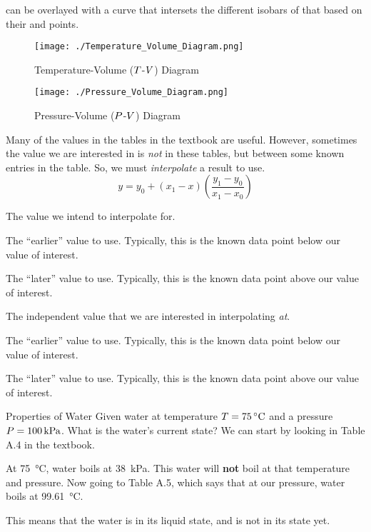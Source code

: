  can be overlayed with a curve that intersets the different isobars of that  based on their  and  points.

\begin{figure}[h!tbp]
  \centering
  \texttt{[image: ./Temperature\_Volume\_Diagram.png]}
  \caption{Temperature-Volume ($T$-$V$) Diagram}
  \label{fig:Temperature_Pressure_Diagram}
\end{figure}

\begin{figure}[h!tbp]
  \centering
  \texttt{[image: ./Pressure\_Volume\_Diagram.png]}
  \caption{Pressure-Volume ($P$-$V$) Diagram}
  \label{fig:Pressure_Volume_Diagram}
\end{figure}

\begin{definition}[Interpolate]\label{def:Interpolate}
  Many of the values in the tables in the textbook are useful.
  However, sometimes the value we are interested in is \textit{not} in these tables, but between some known entries in the table.
  So, we must \emph{interpolate} a result to use.
  \begin{equation}\label{eq:Interpolate}
    y = y_{0} + (x_{1} - x) \left( \frac{y_{1} - y_{0}}{x_{1} - x_{0}} \right)
  \end{equation}
  \begin{description}[noitemsep]
  \item[$y$] The value we intend to interpolate for.
  \item[$y_{0}$] The ``earlier'' value to use.
    Typically, this is the known data point below our value of interest.
  \item[$y_{1}$] The ``later'' value to use.
    Typically, this is the known data point above our value of interest.
  \item[$x$] The independent value that we are interested in interpolating \textit{at}.
  \item[$x_{0}$] The ``earlier'' value to use.
    Typically, this is the known data point below our value of interest.
  \item[$x_{1}$] The ``later'' value to use.
    Typically, this is the known data point above our value of interest.
  \end{description}
\end{definition}

\begin{example}{Properties of Water}
  Given water at temperature $\Temp = \SI{75}{\degreeCelsius}$ and a pressure $P = \SI{100}{\kilo\pascal}$.
  What is the water's current state?
  \tcblower{}
  We can start by looking in Table A.4 in the textbook.

  At \SI{75}{\degreeCelsius}, water boils at \SI{38}{\kilo\pascal}.
  This water will \textbf{not} boil at that temperature and pressure.
  Now going to Table A.5, which says that at our pressure, water boils at \SI{99.61}{\degreeCelsius}.

  This means that the water is in its liquid state, and is not in its  state yet.
\end{example}

